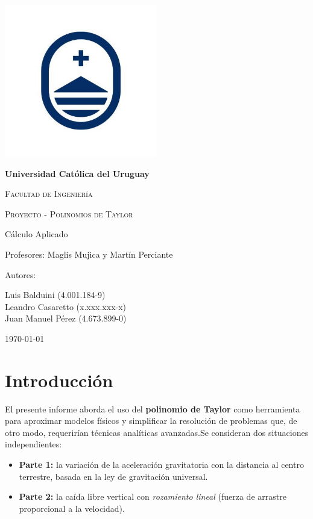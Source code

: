 \documentclass{article}
\begin{document}
    \begin{titlepage}
        \centering
        {\includegraphics[width=0.5\textwidth]{assets/logo2}\par}
        {\bfseries\LARGE Universidad Católica del Uruguay \par}
        \vspace{0.3cm}
        {\scshape\Large Facultad de Ingeniería \par}
        \vspace{0.3cm}
        {\scshape\Huge Proyecto - Polinomios de Taylor\par}
        \vspace{1cm}
        {\Large Cálculo Aplicado \par}
        {\Large Profesores: Maglis Mujica y Martín Perciante \par}
        \vfill
        {\Large Autores: \par}
        {\Large Luis Balduini (4.001.184-9)\\Leandro Casaretto (x.xxx.xxx-x)\\Juan Manuel Pérez (4.673.899-0) \par}
        \vfill
        {\Large \today \par}
    \end{titlepage}

    \section{Introducción}\label{sec:intro}
El presente informe aborda el uso del \textbf{polinomio de Taylor} como
herramienta para aproximar modelos físicos y simplificar la resolución de
problemas que, de otro modo, requerirían técnicas analíticas avanzadas.Se consideran dos situaciones independientes:

\begin{itemize}
\item \textbf{Parte 1:} la variación de la aceleración gravitatoria con la
distancia al centro terrestre, basada en la ley de gravitación universal.
\item \textbf{Parte 2:} la caída libre vertical con \emph{rozamiento lineal}
(fuerza de arrastre proporcional a la velocidad).
\end{itemize}
\end{document}
